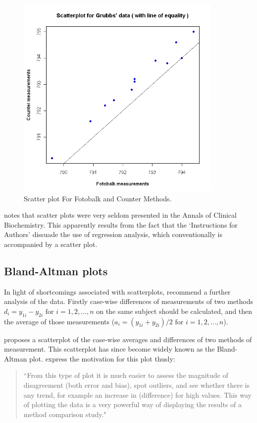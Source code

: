 \documentclass[12pt, a4paper]{report}
\theoremstyle{plain}
\theoremstyle{definition}
\theoremstyle{remark}
\begin{document}
	\begin{figure}[h!]
		\begin{center}
			\includegraphics[width=100mm]{images/GrubbsScatter.jpeg}
			\caption{Scatter plot For Fotobalk and Counter Methods.}\label{GrubbsScatter}
		\end{center}
	\end{figure}
	
	\citet{Dewitte} notes that scatter plots were very seldom presented in the Annals of Clinical Biochemistry. This apparently
	results from the fact that the `Instructions for Authors' dissuade the use of regression analysis, which conventionally is accompanied by a scatter plot.
	
	\newpage
	\subsection{Bland-Altman plots}
	
	In light of shortcomings associated with scatterplots, \citet*{BA83} recommend a further analysis of the data. Firstly
	case-wise differences of measurements of two methods $d_{i} = y_{1i}-y_{2i} \mbox{ for }i=1,2,\dots,n$ on the same subject
	should be calculated, and then the average of those measurements ($a_{i} = (y_{1i} + y_{2i})/2 \mbox{ for }i=1,2,\dots, n$).
	
	\citet{BA83} proposes a scatterplot of the case-wise averages and differences of two methods of measurement. This scatterplot has since become widely known as the Bland-Altman plot. \citet*{BA83} express the
	motivation for this plot thusly:
	\begin{quote}
		``From this type of plot it is much easier to assess the magnitude
		of disagreement (both error and bias), spot outliers, and see
		whether there is any trend, for example an increase in (difference) for high values. This way of plotting the data is a very powerful way of displaying the results of a method comparison study."
	\end{quote}
	
\end{document}

